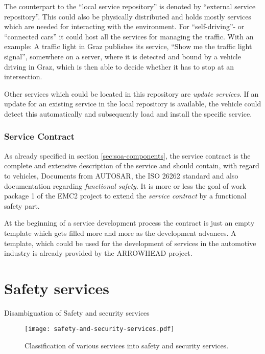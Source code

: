 The counterpart to the ``local service repository'' is denoted by ``external service repository''. This could also be physically distributed and holds mostly services which are needed for interacting with the environment. For ``self-driving''- or ``connected cars'' it could host all the services for managing the traffic. With an example: A traffic light in Graz publishes its service, ``Show me the traffic light signal'', somewhere on a server, where it is detected and bound by a vehicle driving in Graz, which is then able to decide whether it has to stop at an intersection.

Other services which could be located in this repository are \emph{update services}. If an update for an existing service in the local repository is available, the vehicle could detect this automatically and subsequently load and install the specific service.


\subsubsection*{Service Contract}

As already specified in section \ref{sec:soa-components}, the service contract is the complete and extensive description of the service and should contain, with regard to vehicles, Documents from AUTOSAR, the ISO 26262 standard and also documentation regarding \emph{functional safety}. It is more or less the goal of work package 1 of the EMC2 project to extend the \emph{service contract} by a functional safety part.

At the beginning of a service development process the contract is just an empty template which gets filled more and more as the development advances. A template, which could be used for the development of services in the automotive industry is already provided by the ARROWHEAD project.







\section{Safety services}

Disambiguation of Safety and security services 

\begin{figure}[ht]
\centering
\caption{Classification of various services into safety and security services.}
\label{fig:safety-and-security-services}
\texttt{[image: safety-and-security-services.pdf]}
\end{figure}

